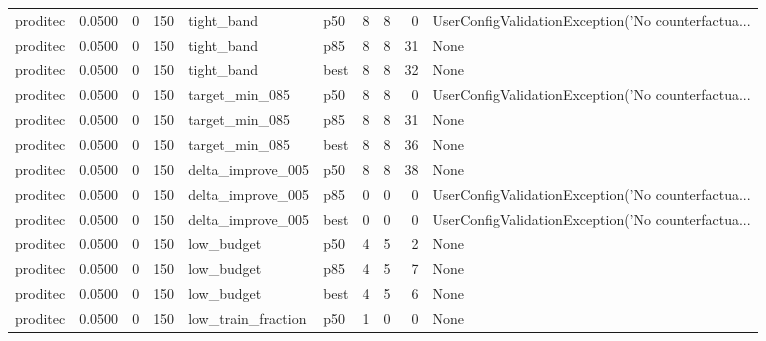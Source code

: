 \begin{tabular}{lrrrllrrrl}
proditec &    0.0500 &    0 &    150 &           tight\_band &    p50 &               8 &          8 &       0 & UserConfigValidationException('No counterfactua... \\
proditec &    0.0500 &    0 &    150 &           tight\_band &    p85 &               8 &          8 &      31 &                                               None \\
proditec &    0.0500 &    0 &    150 &           tight\_band &   best &               8 &          8 &      32 &                                               None \\
proditec &    0.0500 &    0 &    150 &       target\_min\_085 &    p50 &               8 &          8 &       0 & UserConfigValidationException('No counterfactua... \\
proditec &    0.0500 &    0 &    150 &       target\_min\_085 &    p85 &               8 &          8 &      31 &                                               None \\
proditec &    0.0500 &    0 &    150 &       target\_min\_085 &   best &               8 &          8 &      36 &                                               None \\
proditec &    0.0500 &    0 &    150 &    delta\_improve\_005 &    p50 &               8 &          8 &      38 &                                               None \\
proditec &    0.0500 &    0 &    150 &    delta\_improve\_005 &    p85 &               0 &          0 &       0 & UserConfigValidationException('No counterfactua... \\
proditec &    0.0500 &    0 &    150 &    delta\_improve\_005 &   best &               0 &          0 &       0 & UserConfigValidationException('No counterfactua... \\
proditec &    0.0500 &    0 &    150 &           low\_budget &    p50 &               4 &          5 &       2 &                                               None \\
proditec &    0.0500 &    0 &    150 &           low\_budget &    p85 &               4 &          5 &       7 &                                               None \\
proditec &    0.0500 &    0 &    150 &           low\_budget &   best &               4 &          5 &       6 &                                               None \\
proditec &    0.0500 &    0 &    150 &   low\_train\_fraction &    p50 &               1 &          0 &       0 &                                               None \\

\end{tabular}
